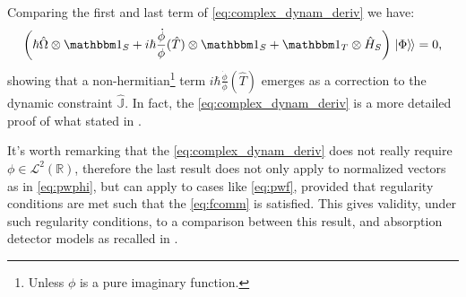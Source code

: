 Comparing the first and last term of \eqref{eq:complex_dynam_deriv} we have:
\begin{equation}\label{eq:nonu_pwwdw}
  \qty(
    \hbar\hat{\Omega} \ox \idop_S +
    i \hbar \frac{\dot{\phi}}{\phi} (\hat{T}) \ox \idop_S +
    \idop_T \ox \hat{H}_S
  ) \dket{\Phi} = 0
  \text{,}
\end{equation}
showing that a non-hermitian\footnote{
  Unless $\phi$  is a pure imaginary function.
}
term
$i \hbar \frac{\dot{\phi}}{\phi} (\hat{T})$
emerges as a correction to the dynamic constraint $\hat{\mathbb{J}}$.
In fact, the \eqref{eq:complex_dynam_deriv}
is a more detailed proof of what stated in
\cite[eq. 27]{Lloyd:Time}.

It's worth remarking that the \eqref{eq:complex_dynam_deriv} does not really require
$\phi \in \mathcal{L}^2(\mathbb{R})$, therefore the last result does not only apply
to normalized vectors as in \eqref{eq:pwphi}, but can apply to cases like
\eqref{eq:pwf}, provided that regularity conditions are met such that
the \eqref{eq:fcomm} is satisfied.
This gives validity,
under such regularity conditions,
to a comparison
between 
this  result,
and absorption detector models
as recalled in \cite{RuschhauptAbsorption}.